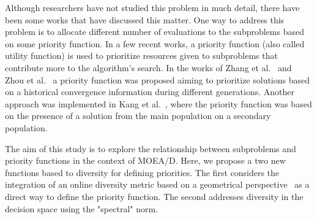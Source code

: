 Although researchers have not studied this problem in much detail, there have been some works that have discussed this matter. One way to address this problem is to allocate different number of evaluations to the subproblems based on some priority function. In a few recent works, a priority function (also called utility function) is used to prioritize resources given to subproblems that contribute more to the algorithm's search.  In the works of Zhang et al.~\cite{zhang2009performance} and Zhou et al.~\cite{zhou2016all} a priority function was proposed aiming to prioritize solutions based on a historical convergence information during different generations. Another approach was implemented in Kang et al.~\cite{kang2018collaborative}, where the priority function was based on the presence of a solution from the main population on a secondary population.

The aim of this study is to explore the relationship between subproblems and priority functions in the context of MOEA/D. Here, we propose a two new functions based to diversity for defining priorities. The first considers the integration of an online diversity metric based on a geometrical perspective~\cite{gee2015online} as a direct way to define the priority function. The second addresses diversity in the decision space using the "spectral" norm.%



